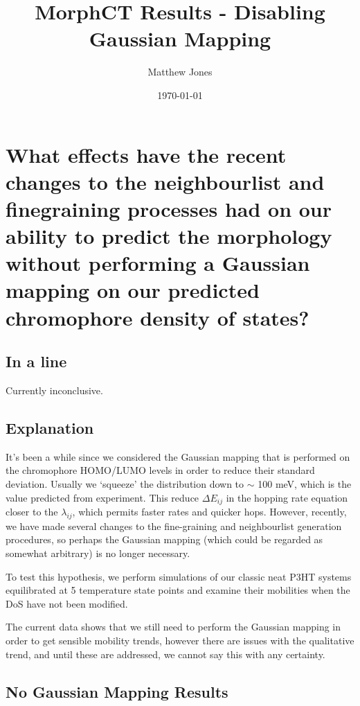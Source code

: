 \documentclass[12pt]{article}
\title{MorphCT Results - Disabling Gaussian Mapping}
\author{Matthew Jones}
\date{\today}
\begin{document}
\maketitle


\section{What effects have the recent changes to the neighbourlist and finegraining processes had on our ability to predict the morphology without performing a Gaussian mapping on our predicted chromophore density of states?}


\subsection{In a line}

Currently inconclusive.

\subsection{Explanation}


It's been a while since we considered the Gaussian mapping that is performed on the chromophore HOMO/LUMO levels in order to reduce their standard deviation.
Usually we `squeeze' the distribution down to $\sim$ 100 meV, which is the value predicted from experiment.
This reduce $\Delta E_{ij}$ in the hopping rate equation closer to the $\lambda_{ij}$, which permits faster rates and quicker hops.
However, recently, we have made several changes to the fine-graining and neighbourlist generation procedures, so perhaps the Gaussian mapping (which could be regarded as somewhat arbitrary) is no longer necessary.

To test this hypothesis, we perform simulations of our classic neat P3HT systems equilibrated at 5 temperature state points and examine their mobilities when the DoS have not been modified.

The current data shows that we still need to perform the Gaussian mapping in order to get sensible mobility trends, however there are issues with the qualitative trend, and until these are addressed, we cannot say this with any certainty.

\clearpage

\subsection{No Gaussian Mapping Results}
\end{document}
